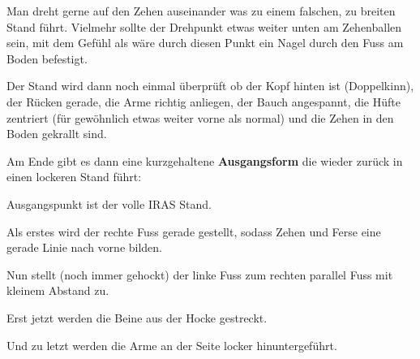 	
\begin{WTCommonNoob}
	Man dreht gerne auf den Zehen auseinander was zu einem falschen, zu breiten Stand f\"uhrt. Vielmehr sollte der Drehpunkt etwas weiter unten am Zehenballen sein, mit dem Gef\"uhl als w\"are durch diesen Punkt ein Nagel durch den Fuss am Boden befestigt.
\end{WTCommonNoob}

Der Stand wird dann noch einmal \"uberpr\"uft ob der Kopf hinten ist (Doppelkinn), der R\"ucken gerade, die Arme richtig anliegen, der Bauch angespannt, die H\"ufte zentriert (f\"ur gew\"ohnlich etwas weiter vorne als normal)  und die Zehen in den Boden gekrallt sind.





Am Ende gibt es dann eine kurzgehaltene \textbf{Ausgangsform} die wieder zur\"uck in einen lockeren Stand f\"uhrt:

\begin{WTalphenumNarrow}
	\item Ausgangspunkt ist der volle IRAS Stand.
	\item Als erstes wird der rechte Fuss gerade gestellt, sodass Zehen und Ferse eine gerade Linie nach vorne bilden.
	\item Nun stellt (noch immer gehockt) der linke Fuss zum rechten parallel Fuss mit kleinem Abstand zu.
	\item Erst jetzt werden die Beine aus der Hocke gestreckt.
	\item Und zu letzt werden die Arme an der Seite locker hinuntergef\"uhrt.
\end{WTalphenumNarrow}


\newpage



% 

